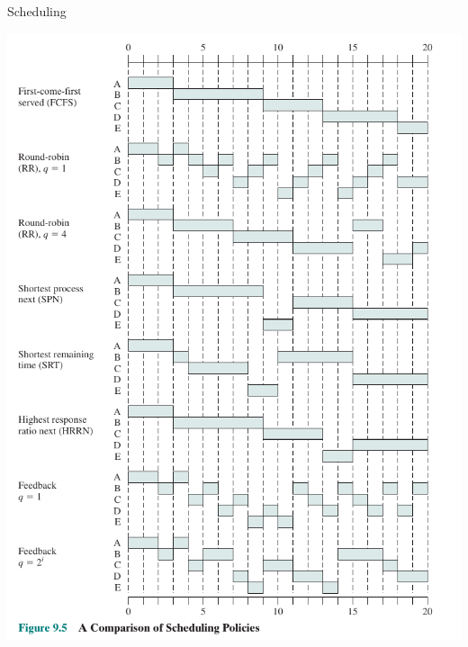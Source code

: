 \documentclass[10pt]{beamer}
\begin{document}
\begin{frame}[allowframebreaks]{Scheduling}
\begin{center}
    \includegraphics[keepaspectratio, width=\textwidth, height=\textheight-2\baselineskip-2\baselineskip]{img/011_sched___.png} \\ \framebreak

\end{center}
\end{frame}
\end{document}
